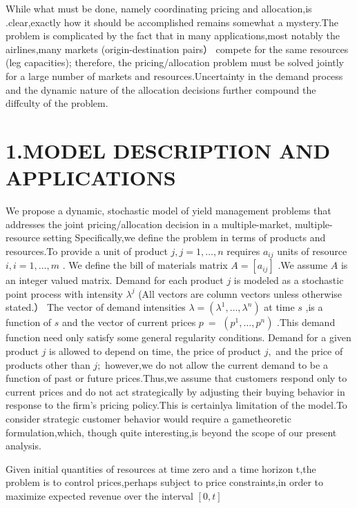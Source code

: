 While what must be done, namely coordinating pricing and allocation,is
.clear,exactly how it should be accomplished remains somewhat a
mystery.The problem is complicated by the fact that in many
applications,most notably the airlines,many markets (origin-destination
pairs） compete for the same resources (leg capacities); therefore, the
pricing/allocation problem must be solved jointly for a large number of
markets and resources.Uncertainty in the demand process and the dynamic
nature of the allocation decisions further compound the diffculty of the
problem.

\section{1.MODEL DESCRIPTION AND
APPLICATIONS}\label{model-description-and-applications}

We propose a dynamic, stochastic model of yield management problems that
addresses the joint pricing/allocation decision in a multiple-market,
multiple-resource setting Specifically,we define the problem in terms of
products and resources.To provide a unit of product
\(j , j = 1 , \ldots , n\) requires \(a _ { i j }\) units of resource
\(i , i = 1 , \ldots , m\) . We define the bill of materials matrix
\(A = [ a _ { i j } ]\) .We assume \(A\) is an integer valued matrix.
Demand for each product \(j\) is modeled as a stochastic point process
with intensity \(\lambda ^ { j }\) (All vectors are column vectors
unless otherwise stated.） The vector of demand intensities
\(\lambda = ( \lambda ^ { 1 } , \ldots , \lambda ^ { n } )\) at time
\(s\) ,is a function of \(s\) and the vector of current prices \(p \ =\)
\(( p ^ { 1 } , \ldots , p ^ { n } )\) .This demand function need only
satisfy some general regularity conditions. Demand for a given product
\(j\) is allowed to depend on time, the price of product \(j ,\) and the
price of products other than \(j ;\) however,we do not allow the current
demand to be a function of past or future prices.Thus,we assume that
customers respond only to current prices and do not act strategically by
adjusting their buying behavior in response to the firm's pricing
policy.This is certainlya limitation of the model.To consider strategic
customer behavior would require a gametheoretic formulation,which,
though quite interesting,is beyond the scope of our present analysis.

Given initial quantities of resources at time zero and a time horizon
t,the problem is to control prices,perhaps subject to price
constraints,in order to maximize expected revenue over the interval
\([ 0 , t ]\)

